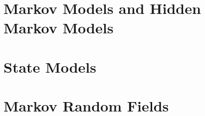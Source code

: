 \section{Markov Models and Hidden Markov Models}


\section{State Models}


\section{Markov Random Fields}

